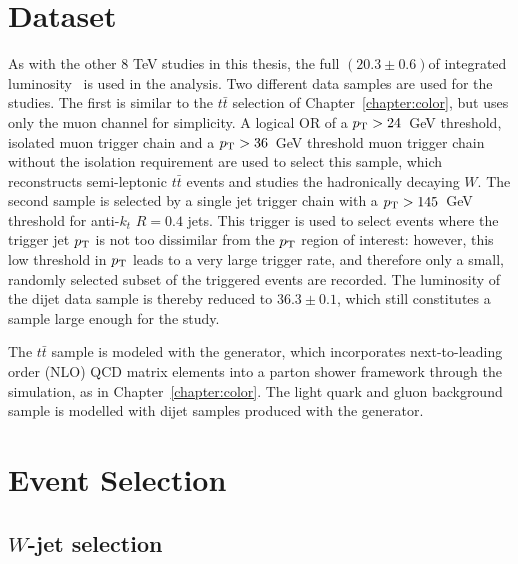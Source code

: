 \section{Dataset}
\label{app:qjets:datasets}

As with the other 8 TeV studies in this thesis, the full $(20.3\pm0.6)$\invfb of integrated luminosity~\cite{ATLASLumi} is used in the analysis. Two different data samples are used for the studies. The first is similar to the $t\bar{t}$ selection of Chapter~\ref{chapter:color}, but uses only the muon channel for simplicity. A logical OR of a $p_{\rm T}>24$~GeV threshold, isolated muon trigger chain and a $p_{\rm T}>36$~GeV threshold muon trigger chain without the isolation requirement are used to select this sample, which reconstructs semi-leptonic $t\bar{t}$ events and studies the hadronically decaying $W$. The second sample is selected by a single jet trigger chain with a $p_{\rm T}>145$~GeV threshold for anti-$k_t$ $R=0.4$ jets. This trigger is used to select events where the trigger jet $p_{\rm T}$ is not too dissimilar from the $p_{\rm T}$ region of interest: however, this low threshold in $p_{\rm T}$ leads to a very large trigger rate, and therefore only a small, randomly selected subset of the triggered events are recorded. The luminosity of the dijet data sample is thereby reduced to $36.3\pm0.1$\invpb, which still constitutes a sample large enough for the study.



The $t\bar{t}$ sample is modeled with the \Powheg generator, which incorporates next-to-leading order (NLO) QCD matrix elements into a parton shower framework through the \Pythia simulation, as in Chapter~\ref{chapter:color}. The light quark and gluon background sample is modelled with dijet samples produced with the \Pythia generator. 


\section{Event Selection}
\label{app:qjets:event-selection}

\subsection{$W$-jet selection}

